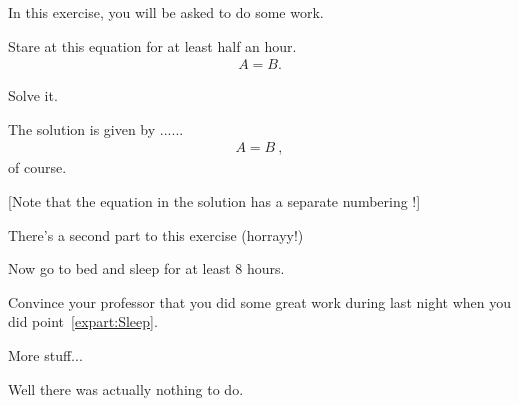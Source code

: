 \documentclass[11pt,a4paper]{article}
\begin{document}
\MakeUebungHeader


In this exercise, you will be asked to do some work.

\begin{exenumerate}
\item Stare at this equation for at least half an hour.
  \begin{align}
    A = B.
  \end{align}

\item Solve it.

  \begin{loesung}%
    The solution is given by ...... 
    \begin{align}
      A=B\ ,
    \end{align}
    of course.

    [Note that the equation in the solution has a separate numbering !]
  \end{loesung}
\end{exenumerate}

There's a second part to this exercise (horrayy!)

\begin{exenumerate} %
\item \label{expart:Sleep} Now go to bed and sleep for at least 8 hours.
\item Convince your professor that you did some great work during last night when you did
  point~\ref{expart:Sleep}.
\end{exenumerate}



More stuff...

\begin{solution} %
  Well there was actually nothing to do.
\end{solution}
\end{document}
